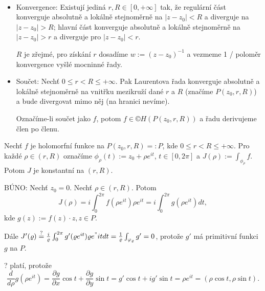 \documentclass[12pt]{article}					%
\begin{document}
\begin{tvrzeni}[Vlastnosti]
	\ 
	
	\begin{itemize}
		\item Konvergence: Existují jediná $r, R \in [0, +∞]$ tak, že regulární část konverguje absolutně a lokálně stejnoměrně na $|z - z_0| < R$ a diverguje na $|z - z_0| > R$; hlavní část konverguje absolutně a lokálně stejnoměrně na $|z - z_0| > r$ a diverguje pro $|z - z_0|<r$.

			$R$ je zřejmé, pro získání $r$ dosadíme $w := (z - z_0)^{-1}$ a vezmeme 1 / poloměr konvergence vyšlé mocninné řady.
		\item Součet: Nechť $0 ≤ r < R ≤ +∞$. Pak Laurentova řada konverguje absolutně a lokálně stejnoměrně na vnitřku mezikruží dané $r$ a $R$ (značíme $P(z_0, r, R)$) a bude divergovat mimo něj (na hranici nevíme).

			Označíme-li součet jako $f$, potom $f \in ©H(P(z_0, r, R))$ a řadu derivujeme člen po členu.
	\end{itemize}
\end{tvrzeni}

\begin{lemma}
	Nechť $f$ je holomorfní funkce na $P(z_0, r, R) =: P$, kde $0 ≤ r < R ≤ +∞$. Pro každé $\rho \in (r, R)$ označíme $\phi_\rho(t) := z_0 + \rho e^{it}$, $t \in [0, 2\pi]$ a $J(\rho) := \int_{\phi_\rho} f$. Potom $J$ je konstantní na $(r, R)$.

	\begin{dukazin}
		BÚNO: Nechť $z_0 = 0$. Nechť $\rho \in (r, R)$. Potom
		$$ J(\rho) = i \int_0^{2\pi} f(\rho e^{it}) \rho e^{it} = i \int_0^{2\pi} g(\rho e^{it}) dt, $$
		kde $g(z) := f(z)·z, z \in P$.

		Dále $J'(\rho) \overset?= \frac{i}{\rho} \int_0^{2\pi} g'(\rho e^{it}) \rho e^"{it} dt = \frac{1}{\rho} \int_{\phi_\rho} g' = 0$, protože $g'$ má primitivní funkci $g$ na $P$.

		? platí, protože
		$$ \frac{d}{d\rho}g(\rho e^{it}) = \frac{\partial g}{\partial x} \cos t + \frac{\partial g}{\partial y} \sin t = g' \cos t + i g' \sin t = \rho e^{it} = (\rho \cos t, \rho \sin t). $$
	\end{dukazin}
\end{lemma}
\end{document}
